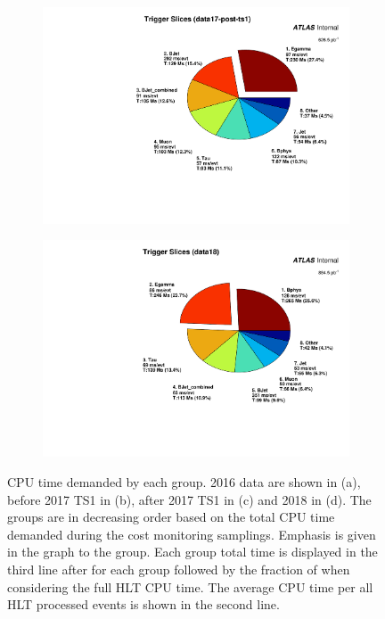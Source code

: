 \begin{figure}[h!tb]
\begin{subfigure}[c]{.48\textwidth}
\caption{}%
\label{fig:run2_monitored_cpu_per_group_data17_pre}
\end{subfigure} \\
\begin{subfigure}[c]{.48\textwidth}
  \includegraphics[width=\textwidth]{appendices/figures/menu_cpu_measurements/run2_slice_cpu_slices_pie_data17-post-ts1.pdf}
\caption{}%
\label{fig:run2_monitored_cpu_per_group_data17_post}
\end{subfigure} 
\begin{subfigure}[c]{.48\textwidth}
  \includegraphics[width=\textwidth]{appendices/figures/menu_cpu_measurements/run2_slice_cpu_slices_pie_data18.pdf}
\caption{}%
\label{fig:run2_monitored_cpu_per_group_data18}
\end{subfigure} 
\caption{\label{fig:run2_monitored_cpu_per_group}CPU time demanded by each
  group. 2016 data are shown in (a), before 2017 TS1 in (b), after 2017 TS1 in
  (c) and 2018 in (d). The groups are in decreasing order based on the
  total CPU time demanded during the cost monitoring samplings. Emphasis is
  given in the graph to the \egamma{} group. Each group total time is displayed
  in the third line after for each group followed by the fraction of when
  considering the full HLT CPU time. The average CPU time per all HLT processed
  events is shown in the second line.
}
\end{figure}

